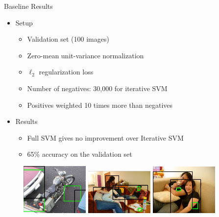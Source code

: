 \documentclass[compress,aspectratio=43]{beamer}
\begin{document}
\begin{frame}{Baseline Results}
 {
    \begin{itemize}
    \item Setup
        \begin{itemize}
            \item Validation set (100 images)
            \item Zero-mean unit-variance normalization
            \item $\ell_2$ regularization loss
            \item Number of negatives: 30,000 for iterative SVM
            \item Positives weighted 10 times more than negatives
        \end{itemize}
    \item Results
        \begin{itemize}
        \item Full SVM gives no improvement over Iterative SVM
        \item 65\% accuracy on the validation set
        \end{itemize}
    \end{itemize}
}
 {
    \begin{figure}
		\centering
		\includegraphics[width=0.3\textwidth]{figures/baseline/example1.png}
		\hspace{2mm}
		\includegraphics[width=0.3\textwidth]{figures/baseline/example2.png}
		\hspace{2mm}
		\includegraphics[width=0.3\textwidth]{figures/baseline/example3.png}\\

\end{figure}}
\end{frame}
\end{document}
